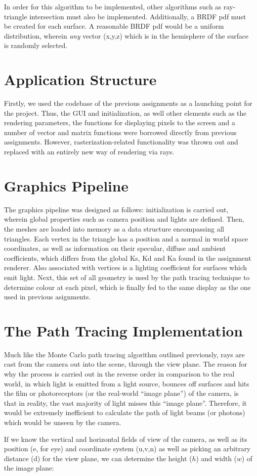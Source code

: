\documentclass[journal]{IEEEtran}
\begin{document}
In order for this algorithm to be implemented, other algorithms such as ray-triangle intersection must also be implemented. 
Additionally, a BRDF pdf must be created for each surface. A reasonable BRDF pdf would be a uniform distribution, wherein \emph{any} 
vector (x,y,z) which is in the hemisphere of the surface is randomly selected.

\section{Application Structure}
Firstly, we used the codebase of the previous assignments as a launching point for the project. Thus, the GUI and initialization, as well other elements such as the rendering parameters, the functions for displaying pixels to the screen and a number of vector and matrix functions were borrowed directly from previous assignments. However, rasterization-related functionality was thrown out and replaced with an entirely new way of rendering via rays.

\section{Graphics Pipeline}
The graphics pipeline was designed as follows: initialization is carried out, wherein global properties such as camera position and lights are defined. Then, the meshes are loaded into memory as a data structure encompassing all triangles. Each vertex in the triangle has a position and a normal in world space coordinates, as well as information on their specular, diffuse and ambient coefficients, which differs from the global Ks, Kd and Ka found in the assignment renderer. Also associated with vertices is a lighting coefficient for surfaces which emit light. Next, this set of all geometry is used by the path tracing technique to determine colour at each pixel, which is finally fed to the same display as the one used in previous asignments.

\section{The Path Tracing Implementation}
Much like the Monte Carlo path tracing algorithm outlined previously, rays are cast from the camera out into the scene, through the view plane. The reason for why the process is carried out in the reverse order in comparison to the real world, in which light is emitted from a light source, bounces off surfaces and hits the film or photoreceptors (or the real-world ``image plane'') of the camera, is that in reality, the vast majority of light misses this ``image plane''. Therefore, it would be extremely inefficient to calculate the path of light beams (or photons) which would be unseen by the camera.
\par
If we know the vertical and horizontal fields of view of the camera, as well as its position (e, for eye) and coordinate system (u,v,n) as well as picking an arbitrary distance (d) for the view plane, we can determine the height ($h$) and width ($w$) of the image plane:
\end{document}

